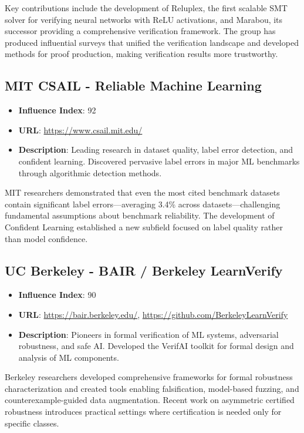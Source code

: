 \documentclass[12pt,a4paper]{article}
\begin{document}
Key contributions include the development of Reluplex, the first scalable SMT solver for verifying neural networks with ReLU activations, and Marabou, its successor providing a comprehensive verification framework. The group has produced influential surveys that unified the verification landscape and developed methods for proof production, making verification results more trustworthy.

\subsection{MIT CSAIL - Reliable Machine Learning}

\begin{itemize}
\item \textbf{Influence Index}: 92
\item \textbf{URL}: \url{https://www.csail.mit.edu/}
\item \textbf{Description}: Leading research in dataset quality, label error detection, and confident learning. Discovered pervasive label errors in major ML benchmarks through algorithmic detection methods.
\end{itemize}

MIT researchers demonstrated that even the most cited benchmark datasets contain significant label errors—averaging 3.4\% across datasets—challenging fundamental assumptions about benchmark reliability. The development of Confident Learning established a new subfield focused on label quality rather than model confidence.

\subsection{UC Berkeley - BAIR / Berkeley LearnVerify}

\begin{itemize}
\item \textbf{Influence Index}: 90
\item \textbf{URL}: \url{https://bair.berkeley.edu/}, \url{https://github.com/BerkeleyLearnVerify}
\item \textbf{Description}: Pioneers in formal verification of ML systems, adversarial robustness, and safe AI. Developed the VerifAI toolkit for formal design and analysis of ML components.
\end{itemize}

Berkeley researchers developed comprehensive frameworks for formal robustness characterization and created tools enabling falsification, model-based fuzzing, and counterexample-guided data augmentation. Recent work on asymmetric certified robustness introduces practical settings where certification is needed only for specific classes.
\end{document}
